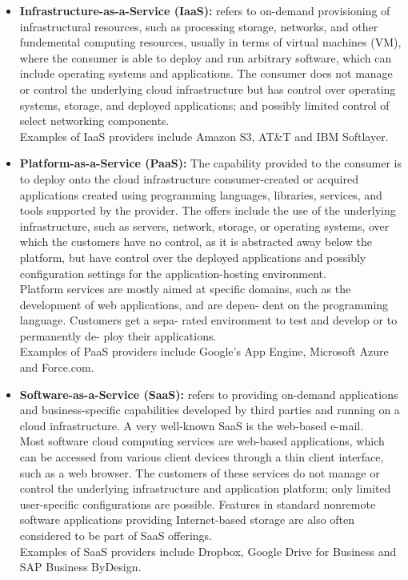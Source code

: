 		\begin{itemize}
			\item {\textbf{Infrastructure-as-a-Service (IaaS):} refers to on-demand provisioning of infrastructural resources, such as processing storage, networks, and other fundemental computing resources, usually in terms of virtual machines (VM), where the consumer is able to deploy and run arbitrary software, which can include operating systems and applications. The consumer does not manage or control the underlying cloud infrastructure but has control over operating systems, storage, and deployed applications; and possibly limited control of select networking components.
			\\Examples of IaaS providers include Amazon S3, AT\&T and IBM Softlayer.}
			\item {\textbf{Platform-as-a-Service (PaaS):} The capability provided to the consumer is to deploy onto the cloud infrastructure consumer-created or acquired applications created using programming languages, libraries, services, and tools supported by the provider. The offers include the use of the underlying infrastructure, such as servers, network, storage, or operating systems, over which the customers have no control, as it is abstracted away below the platform, but have control over the deployed applications and possibly configuration settings for the application-hosting environment.
			\\Platform services are mostly aimed at specific domains, such as the development of web applications, and are depen- dent on the programming language. Customers get a sepa- rated environment to test and develop or to permanently de- ploy their applications.
			\\Examples of PaaS providers include Google's App Engine, Microsoft Azure and Force.com.}
			
			\item {\textbf{Software-as-a-Service (SaaS):} refers to providing on-demand applications and business-specific capabilities developed by third parties and running on a cloud infrastructure. A very well-known SaaS is the web-based e-mail.
			\\Most software cloud computing services are web-based applications, which can be accessed from various client devices through a thin client interface, such as a web browser. The customers of these services do not manage or control the underlying infrastructure and application platform; only limited user-specific configurations are possible. Features in standard nonremote software applications providing Internet-based storage are also often considered to be part of SaaS offerings.
			\\Examples of SaaS providers include Dropbox, Google Drive for Business and SAP Business ByDesign.}
		\end{itemize}

